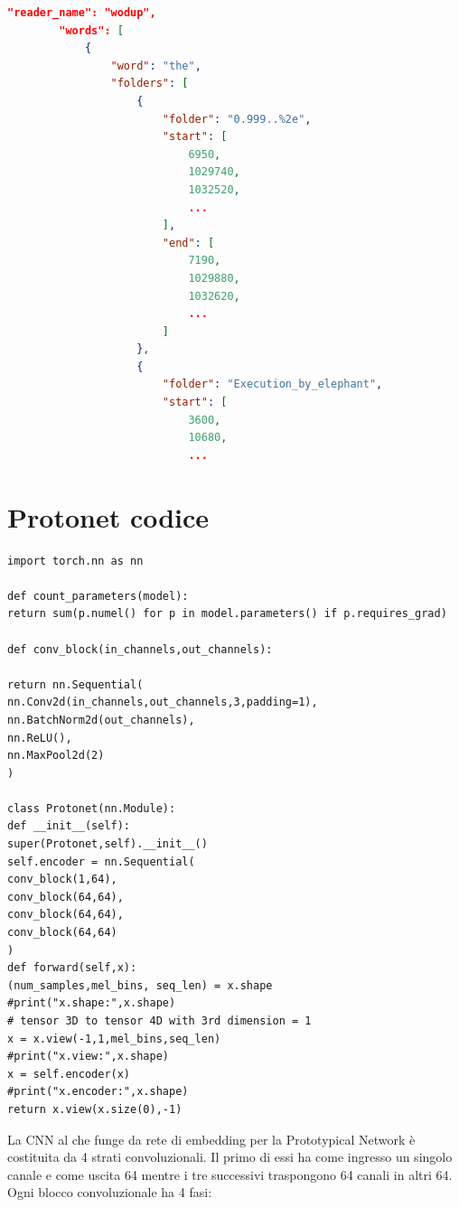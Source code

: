 \documentclass[12pt,a4paper,titlepage]{article}
\begin{document}
\begin{lstlisting}[language=iPython,firstnumber=1, caption=words\_per\_reader.py, label=words_per_reader,captionpos=b]
\end{lstlisting}
	
\begin{lstlisting}[language=json,firstnumber=1, caption=Formato del file readers\_words.json, label=readers_words,captionpos=b]
"reader_name": "wodup",
		"words": [
			{
				"word": "the",
				"folders": [
					{
						"folder": "0.999..%2e",
						"start": [
							6950,
							1029740,
							1032520,
							...
						],
						"end": [
							7190,
							1029880,
							1032620,
							...
						]
					},
					{
						"folder": "Execution_by_elephant",
						"start": [
							3600,
							10680,
							...
\end{lstlisting}



\section{Protonet codice}
\begin{lstlisting}[language=iPython,firstnumber=1, caption=words\_per\_reader.py, label=words_per_reader,captionpos=b]
import torch.nn as nn

def count_parameters(model):
return sum(p.numel() for p in model.parameters() if p.requires_grad)

def conv_block(in_channels,out_channels):

return nn.Sequential(
nn.Conv2d(in_channels,out_channels,3,padding=1),
nn.BatchNorm2d(out_channels),
nn.ReLU(),
nn.MaxPool2d(2)
)

class Protonet(nn.Module):
def __init__(self):
super(Protonet,self).__init__()
self.encoder = nn.Sequential(
conv_block(1,64),
conv_block(64,64),
conv_block(64,64),
conv_block(64,64)
)
def forward(self,x):
(num_samples,mel_bins, seq_len) = x.shape
#print("x.shape:",x.shape)
# tensor 3D to tensor 4D with 3rd dimension = 1
x = x.view(-1,1,mel_bins,seq_len) 
#print("x.view:",x.shape)
x = self.encoder(x)
#print("x.encoder:",x.shape)
return x.view(x.size(0),-1)
\end{lstlisting}
La CNN al che funge da rete di embedding per la Prototypical Network è costituita da 4 strati convoluzionali. Il primo di essi ha come ingresso un singolo canale e come uscita 64 mentre i tre successivi traspongono 64 canali in altri 64.
Ogni blocco convoluzionale ha 4 fasi:
\end{document}
